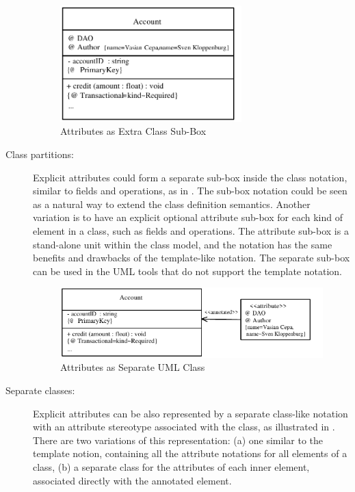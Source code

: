 \begin{description}
\begin{figure}[ht]
		\centering
		\includegraphics[width=7cm,height=!]{append1/box}
	\caption{Attributes as Extra Class Sub-Box}
	\label{fig:partition}
\end{figure}


\item[Class partitions:] Explicit attributes could form a separate sub-box inside the class notation, similar to
  fields and operations, as in .
  The sub-box notation could be seen as a natural way to extend the class
  definition semantics. Another variation is to have an explicit optional
  attribute sub-box for each kind of element in a class, such as fields and operations. The attribute sub-box is a stand-alone unit within the class model, and the notation has the same benefits and drawbacks of the template-like notation. The separate sub-box can be used in the UML tools that do not support the template notation.
  
\begin{figure}[ht]
		\centering
		\includegraphics[width=12cm,height=!]{append1/class}
	\caption{Attributes as Separate UML Class}
	\label{fig:class}
\end{figure}

\item[Separate classes:] Explicit attributes can be also represented by a separate class-like notation with an \flqq{}attribute\frqq{} stereotype associated with the class, as illustrated in . There are two variations of this representation: (a) one similar to the template notion, containing all the attribute notations for all
  elements of a class, (b) a separate class for the attributes of each inner element, associated directly with the annotated element.
  

\end{description}
